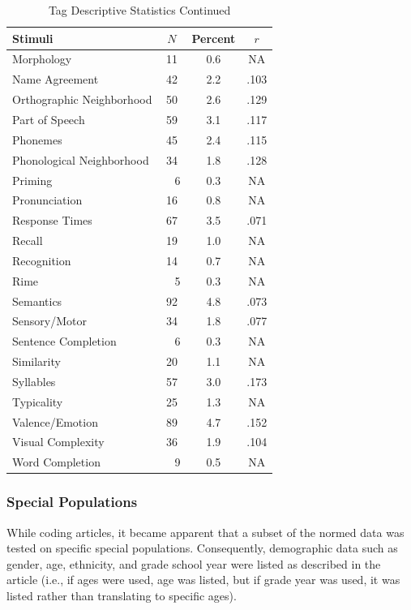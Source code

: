 \documentclass[english,man]{apa6}
\theoremstyle{definition}
\theoremstyle{definition}
\theoremstyle{definition}
\theoremstyle{remark}
\begin{document}
\begin{table}[tbp]
\begin{center}
\begin{threeparttable}
\caption{\label{tab:tag-table2}Tag Descriptive Statistics Continued}
\small{
\begin{tabular}{lccc}
\toprule
Stimuli & $N$ & Percent & $r$\\
\midrule
Morphology & 11 & 0.6 & NA\\
Name Agreement & 42 & 2.2 & .103\\
Orthographic Neighborhood & 50 & 2.6 & .129\\
Part of Speech & 59 & 3.1 & .117\\
Phonemes & 45 & 2.4 & .115\\
Phonological Neighborhood & 34 & 1.8 & .128\\
Priming & \ \ 6 & 0.3 & NA\\
Pronunciation & 16 & 0.8 & NA\\
Response Times & 67 & 3.5 & .071\\
Recall & 19 & 1.0 & NA\\
Recognition & 14 & 0.7 & NA\\
Rime & \ \ 5 & 0.3 & NA\\
Semantics & 92 & 4.8 & .073\\
Sensory/Motor & 34 & 1.8 & .077\\
Sentence Completion & \ \ 6 & 0.3 & NA\\
Similarity & 20 & 1.1 & NA\\
Syllables & 57 & 3.0 & .173\\
Typicality & 25 & 1.3 & NA\\
Valence/Emotion & 89 & 4.7 & .152\\
Visual Complexity & 36 & 1.9 & .104\\
Word Completion & \ \ 9 & 0.5 & NA\\
\bottomrule
\end{tabular}
}
\end{threeparttable}
\end{center}
\end{table}

\subsubsection{Special Populations}\label{special-populations}

While coding articles, it became apparent that a subset of the normed
data was tested on specific special populations. Consequently,
demographic data such as gender, age, ethnicity, and grade school year
were listed as described in the article (i.e., if ages were used, age
was listed, but if grade year was used, it was listed rather than
translating to specific ages).
\end{document}
